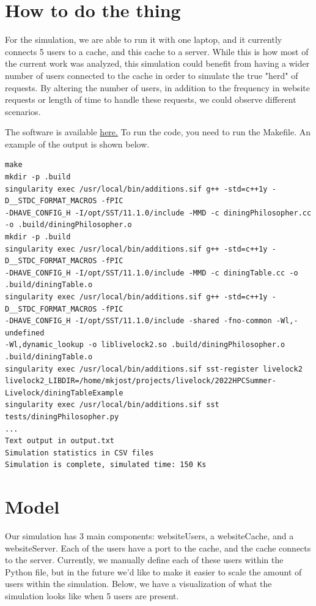 \documentclass{article}
\begin{document}
\section{How to do the thing}


For the simulation, we are able to run it with one laptop, and it currently connects 5 users to a cache, and this cache to a server.  While this is how most of the current work was analyzed, this simulation could benefit from having a wider number of users connected to the cache in order to simulate the true "herd" of requests. By altering the number of users, in addition to the frequency in website requests or length of time to handle these requests, we could observe different scenarios.  \newline

The software is available \href{https://github.com/lpsmodsim/2022HPCSummer-ThunderingHerd}{here.}  To run the code, you need to run the Makefile.  An example of the output is shown below.
 \begin{verbatim}
make
mkdir -p .build
singularity exec /usr/local/bin/additions.sif g++ -std=c++1y -D__STDC_FORMAT_MACROS -fPIC 
-DHAVE_CONFIG_H -I/opt/SST/11.1.0/include -MMD -c diningPhilosopher.cc 
-o .build/diningPhilosopher.o
mkdir -p .build
singularity exec /usr/local/bin/additions.sif g++ -std=c++1y -D__STDC_FORMAT_MACROS -fPIC 
-DHAVE_CONFIG_H -I/opt/SST/11.1.0/include -MMD -c diningTable.cc -o .build/diningTable.o
singularity exec /usr/local/bin/additions.sif g++ -std=c++1y -D__STDC_FORMAT_MACROS -fPIC 
-DHAVE_CONFIG_H -I/opt/SST/11.1.0/include -shared -fno-common -Wl,-undefined 
-Wl,dynamic_lookup -o liblivelock2.so .build/diningPhilosopher.o .build/diningTable.o
singularity exec /usr/local/bin/additions.sif sst-register livelock2 
livelock2_LIBDIR=/home/mkjost/projects/livelock/2022HPCSummer-Livelock/diningTableExample
singularity exec /usr/local/bin/additions.sif sst tests/diningPhilosopher.py 
...
Text output in output.txt
Simulation statistics in CSV files
Simulation is complete, simulated time: 150 Ks
 \end{verbatim}

\section{Model} %

Our simulation has 3 main components: websiteUsers, a websiteCache, and a websiteServer.  Each of the users have a port to the cache, and the cache connects to the server.  Currently, we manually define each of these users within the Python file, but in the future we'd like to make it easier to scale the amount of users within the simulation.  Below, we have a visualization of what the simulation looks like when 5 users are present. \newline
\end{document}
